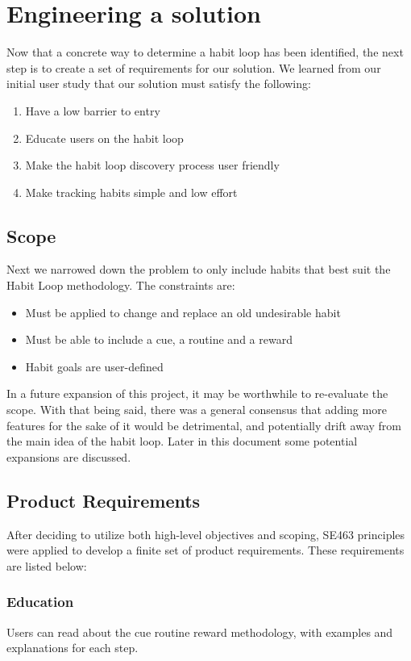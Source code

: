 \section{Engineering a solution}
Now that a concrete way to determine a habit loop has been identified, the next step is to create a set of requirements for our solution. We learned from our initial user study that our solution must satisfy the following:

\begin{enumerate}
    \item Have a low barrier to entry
    \item Educate users on the habit loop
    \item Make the habit loop discovery process user friendly
    \item Make tracking habits simple and low effort
\end{enumerate}

\subsection{Scope}
Next we narrowed down the problem to only include habits that best suit the Habit Loop methodology. The constraints are:


\begin{itemize}
    \item Must be applied to change and replace an old undesirable habit
    \item Must be able to include a cue, a routine and a reward
    \item Habit goals are user-defined
\end{itemize}

In a future expansion of this project, it may be worthwhile to re-evaluate the scope. With that being said, there was a general consensus that adding more features for the sake of it would be detrimental, and potentially drift away from the main idea of the habit loop. Later in this document some potential expansions are discussed.

\subsection{Product Requirements}
After deciding to utilize both high-level objectives and scoping, SE463 principles were applied to develop a finite set of product requirements. These requirements are listed below:
\subsubsection{Education}
Users can read about the cue routine reward methodology, with examples and explanations for each step.
